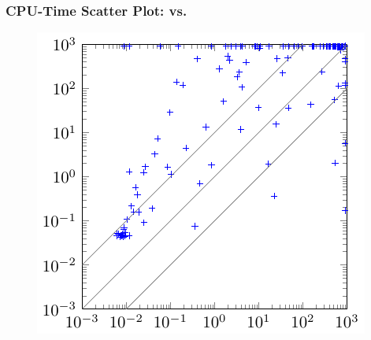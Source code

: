     \begin{frame}
        \frametitle{CPU-Time Scatter Plot: \erssat vs. \dcssat}
        \begin{figure}
            \centering
            \includegraphics{fig/exist-random-ssat/scatter-dcssat.pdf}
        \end{figure}
    \end{frame}
\fi